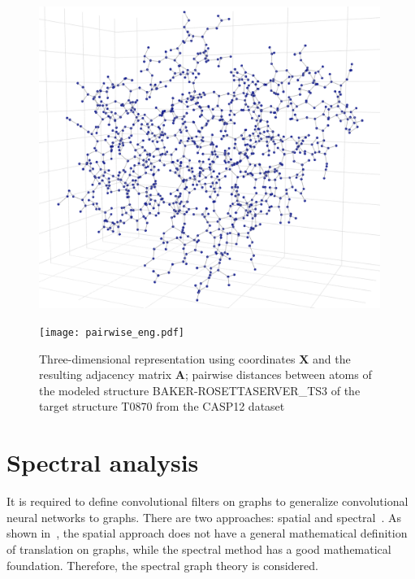 \documentclass[12pt,twosides]{extarticle}
\begin{document}
\begin{figure}[H]
	\centering
	\begin{minipage}[b]{0.49\textwidth}
		\centering
		\includegraphics[width=0.99\textwidth]{3d_graph.pdf}
	\end{minipage}
	\begin{minipage}[b]{0.49\textwidth}
		\centering
		\texttt{[image: pairwise\_eng.pdf]}
	\end{minipage}
	\caption{Three-dimensional representation using coordinates $\textbf{X}$ and the resulting adjacency matrix $\textbf{A}$; pairwise distances between atoms of the modeled structure BAKER-ROSETTASERVER\_TS3 of the target structure T0870 from the CASP12 dataset}
	\label{protein_vis}
\end{figure}


\section{Spectral analysis}

It is required to define convolutional filters on graphs to generalize convolutional neural networks to graphs. There are two approaches: spatial and spectral~\cite{DBLP:journals/corr/abs-1901-00596, DBLP:journals/corr/abs-1812-08434}. As shown in~\cite{ae482107de73461787258f805cf8f4ed}, the spatial approach does not have a general mathematical definition of translation on graphs, while the spectral method has a good mathematical foundation. Therefore, the spectral graph theory is considered.
\end{document}
